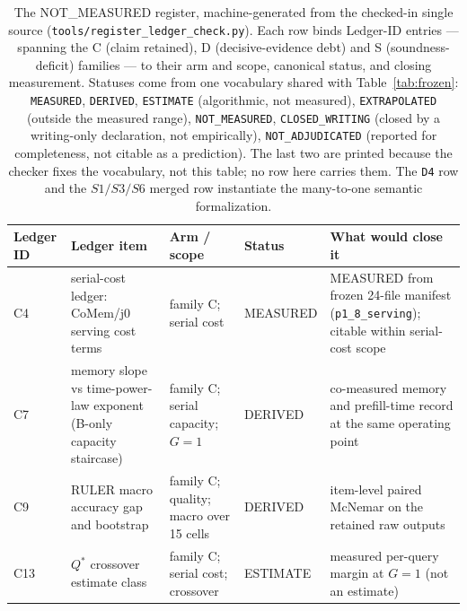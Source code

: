 \documentclass{article}
\newcommand{\code}[1]{\texttt{#1}}
\begin{document}
\begin{table}[tp]
\centering
\caption{The NOT\_MEASURED register, machine-generated from the checked-in single source
(\code{tools/register\_ledger\_check.py}). Each row binds Ledger-ID entries --- spanning the
C (claim retained), D (decisive-evidence debt) and S (soundness-deficit) families --- to their
arm and scope, canonical status, and closing measurement. Statuses come from one vocabulary
shared with Table~\ref{tab:frozen}: \texttt{MEASURED}, \texttt{DERIVED}, \texttt{ESTIMATE}
(algorithmic, not measured), \texttt{EXTRAPOLATED} (outside the measured range),
\texttt{NOT\_MEASURED}, \texttt{CLOSED\_WRITING} (closed by a writing-only declaration, not
empirically), \texttt{NOT\_ADJUDICATED} (reported for completeness, not citable as a
prediction). The last two are printed because the checker fixes the vocabulary, not this table;
no row here carries them. The \texttt{D4} row and the $S1{/}S3{/}S6$ merged row instantiate the
many-to-one semantic formalization.}
\label{tab:reg}
\footnotesize
\setlength{\extrarowheight}{1pt}
\setlength{\tabcolsep}{1.5pt}
\begin{tabular}{@{}>{\raggedright\arraybackslash}p{1.35cm}>{\raggedright\arraybackslash}p{3.3cm}>{\raggedright\arraybackslash}p{2.15cm}>{\raggedright\arraybackslash}p{2.8cm}>{\raggedright\arraybackslash}p{3.85cm}@{}}
\toprule
\textbf{Ledger ID} & \textbf{Ledger item} & \textbf{Arm / scope} &
\textbf{Status} & \textbf{What would close it} \\
\midrule
C4 & serial-cost ledger: CoMem/j0 serving cost terms & family C; serial cost & MEASURED & MEASURED from frozen 24-file manifest (\code{p1\_8\_serving}); citable within serial-cost scope \\
C7 & memory slope vs time-power-law exponent (B-only capacity staircase) & family C; serial capacity; $G{=}1$ & DERIVED & co-measured memory and prefill-time record at the same operating point \\
C9 & RULER macro accuracy gap and bootstrap & family C; quality; macro over 15 cells & DERIVED & item-level paired McNemar on the retained raw outputs \\
C13 & $Q^{*}$ crossover estimate class & family C; serial cost; crossover & ESTIMATE & measured per-query margin at $G{=}1$ (not an estimate) \\

\end{tabular}
\end{table}
\end{document}
